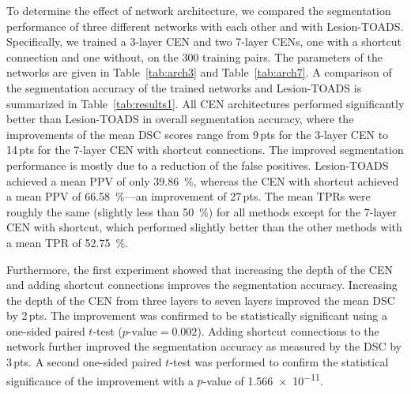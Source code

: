 To determine the effect of network architecture, we compared the segmentation
performance of three different networks with each other and with Lesion-TOADS.
Specifically, we trained a 3-layer CEN and two 7-layer CENs, one with a shortcut
connection and one without, on the 300 training pairs. The parameters of the
networks are given in Table~\ref{tab:arch3} and Table~\ref{tab:arch7}.
A comparison of the segmentation accuracy of the trained networks and
Lesion-TOADS is summarized in Table~\ref{tab:results1}. All CEN architectures
performed significantly better than Lesion-TOADS in overall segmentation
accuracy, where the improvements of the mean DSC scores range from 9\,pts for
the 3-layer CEN to 14\,pts for the 7-layer CEN with shortcut connections. The
improved segmentation performance is mostly due to a reduction of the false
positives. Lesion-TOADS achieved a mean PPV of only \SI{39.86}{\percent},
whereas the CEN with shortcut achieved a mean PPV of \SI{66.58}{\percent}---an
improvement of 27\,pts. The mean TPRs were roughly the same (slightly less than
\SI{50}{\percent}) for all methods except for the 7-layer CEN with shortcut,
which performed slightly better than the other methods with a mean TPR of
\SI{52.75}{\percent}.

Furthermore, the first experiment showed that increasing the depth of the CEN
and adding shortcut connections improves the segmentation accuracy. Increasing
the depth of the CEN from three layers to seven layers improved the mean DSC by
2\,pts. The improvement was confirmed to be statistically significant using a
one-sided paired $t$-test ($p\text{-value}=\num{0.002}$). Adding shortcut
connections to the network further improved the segmentation accuracy as
measured by the DSC by 3\,pts. A second one-sided paired $t$-test was performed
to confirm the statistical significance of the improvement with a $p$-value of
\num{1.566e-11}.


